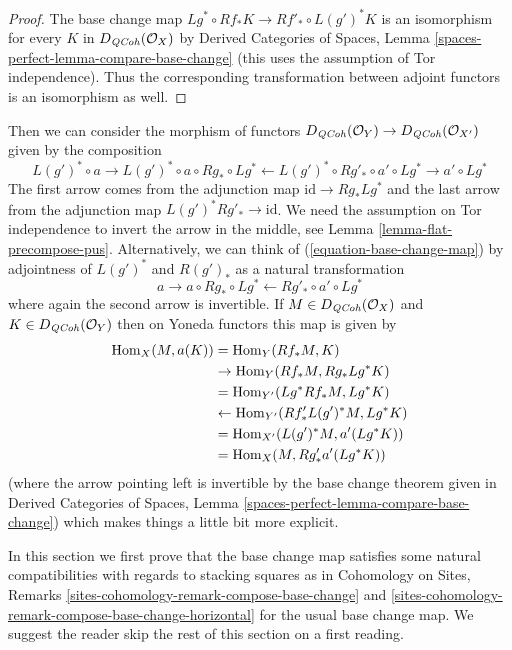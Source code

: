 \begin{proof}
The base change map $Lg^* \circ Rf_* K \to Rf'_* \circ L(g')^*K$
is an isomorphism for every $K$ in $D_{\mathit{QCoh}}(\mathcal{O}_X)$ by
Derived Categories of Spaces, Lemma
\ref{spaces-perfect-lemma-compare-base-change}
(this uses the assumption of Tor independence).
Thus the corresponding transformation between adjoint functors
is an isomorphism as well.
\end{proof}

\noindent
Then we can consider the
morphism of functors
$D_{\mathit{QCoh}}(\mathcal{O}_Y) \to D_{\mathit{QCoh}}(\mathcal{O}_{X'})$
given by the composition
\begin{equation}
\label{equation-base-change-map}
L(g')^* \circ a \to
L(g')^* \circ a \circ Rg_* \circ Lg^* \leftarrow
L(g')^* \circ Rg'_* \circ a' \circ Lg^* \to a' \circ Lg^*
\end{equation}
The first arrow comes from the adjunction map $\text{id} \to Rg_* Lg^*$
and the last arrow from the adjunction map $L(g')^*Rg'_* \to \text{id}$.
We need the assumption on Tor independence to invert the arrow
in the middle, see Lemma \ref{lemma-flat-precompose-pus}.
Alternatively, we can think of (\ref{equation-base-change-map}) by
adjointness of $L(g')^*$ and $R(g')_*$ as a natural transformation
$$
a \to a \circ Rg_* \circ Lg^* \leftarrow Rg'_* \circ a' \circ Lg^*
$$
where again the second arrow is invertible. If $M \in D_{\mathit{QCoh}}(\mathcal{O}_X)$
and $K \in D_{\mathit{QCoh}}(\mathcal{O}_Y)$
then on Yoneda functors this map is given by
\begin{align*}
\mathop{\mathrm{Hom}}\nolimits_X(M, a(K))
& =
\mathop{\mathrm{Hom}}\nolimits_Y(Rf_*M, K) \\
& \to
\mathop{\mathrm{Hom}}\nolimits_Y(Rf_*M, Rg_* Lg^*K) \\
& =
\mathop{\mathrm{Hom}}\nolimits_{Y'}(Lg^*Rf_*M, Lg^*K) \\
& \leftarrow
\mathop{\mathrm{Hom}}\nolimits_{Y'}(Rf'_* L(g')^*M, Lg^*K) \\
& =
\mathop{\mathrm{Hom}}\nolimits_{X'}(L(g')^*M, a'(Lg^*K)) \\
& =
\mathop{\mathrm{Hom}}\nolimits_X(M, Rg'_*a'(Lg^*K))
\end{align*}
(where the arrow pointing left is invertible by the base
change theorem given in
Derived Categories of Spaces, Lemma
\ref{spaces-perfect-lemma-compare-base-change})
which makes things a little bit more explicit.

\medskip\noindent
In this section we first prove that the base change map satisfies
some natural compatibilities with regards to stacking squares as in
Cohomology on Sites, Remarks
\ref{sites-cohomology-remark-compose-base-change} and
\ref{sites-cohomology-remark-compose-base-change-horizontal}
for the usual base change map.
We suggest the reader skip the rest of this section on a first reading.


